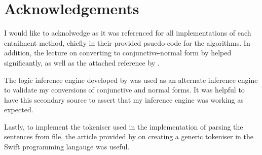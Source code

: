 \section*{Acknowledgements}
\label{sec:Acknowledgements}

I would like to acknolwedge \citet{aima2009} as it was referenced for all
implementations of each entailment method, chiefly in their provided
psuedo-code for the algorithms. In addition, the lecture on converting to
conjunctive-normal form by \citet{meyden2000} helped significantly, as well as
the attached reference by \citet{huth2004}.

The logic inference engine developed by \citet{pybool} was used as an alternate
inference engine to validate my conversions of conjunctive and normal forms. It
was helpful to have this secondary source to assert that my inference engine was
working as expected.

Lastly, to implement the tokeniser used in the implementation of parsing the
sentences from file, the article provided by \citet{swiftstudies} on creating
a generic tokeniser in the Swift programming langauge was useful.

